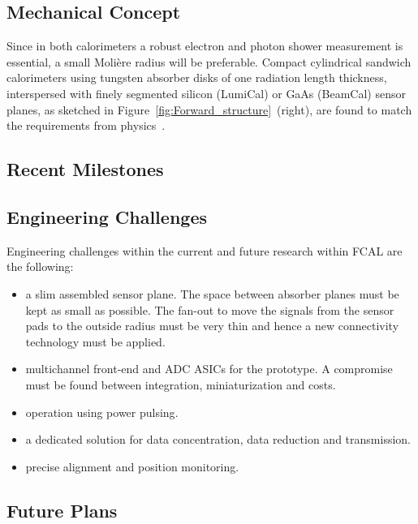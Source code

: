 \subsection{Mechanical Concept}
Since in both calorimeters a robust electron and photon shower measurement
is essential, a small Moli\`{e}re radius will be preferable.
Compact
cylindrical sandwich
calorimeters using tungsten absorber disks of one radiation length thickness, interspersed with
finely segmented silicon (LumiCal) or GaAs (BeamCal) sensor planes, as sketched in
Figure~\ref{fig:Forward_structure}~(right),
are found
to match the requirements from physics~\cite{2010JInst...512002A}.

\subsection{Recent Milestones}
\subsection{Engineering Challenges}
Engineering challenges within the current and future research within FCAL are the following:
\begin{itemize}
\item{a slim assembled sensor plane. The space between absorber planes must be kept as small
as possible. The fan-out to move the signals from the sensor pads to the outside radius must be very thin and
hence a new connectivity technology must be applied.}
\item{multichannel front-end and ADC ASICs for the prototype.
A compromise must be found between integration, miniaturization and costs}.
\item{operation using  power pulsing}.
\item{a dedicated solution for data concentration,  data reduction and transmission}.
\item{ precise alignment and position monitoring}.
\end{itemize}

\subsection{Future Plans}

